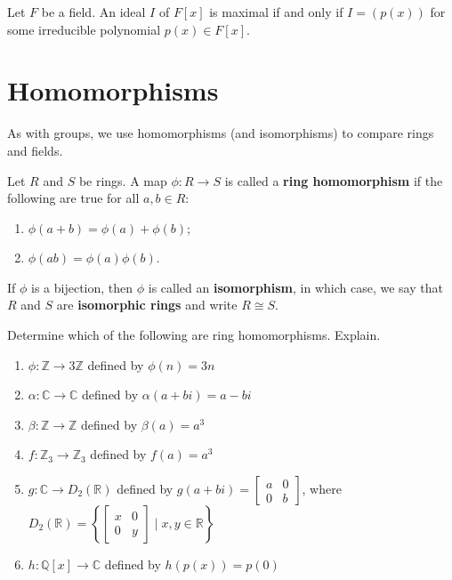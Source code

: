 \begin{theorem}\label{thm.MaximalIFFIrreducibleinFx}
Let $F$ be a field. An ideal $I$ of $F[x]$ is maximal if and only if $I=(p(x))$ for some irreducible polynomial $p(x)\in F[x]$.
\end{theorem}



\section{Homomorphisms}
As with groups, we use homomorphisms (and isomorphisms) to compare rings and fields.

\begin{definition}
Let $R$ and $S$ be rings. A map $\phi:R\to S$ is called a \textbf{ring homomorphism} if the following are true for all $a,b\in R$:
\begin{enumerate}
\item $\phi(a+b)=\phi(a)+\phi(b)$;
\item $\phi(ab)=\phi(a)\phi(b)$.
\end{enumerate}
If $\phi$ is a bijection, then $\phi$ is called an \textbf{isomorphism}, in which case, we say that $R$ and $S$ are \textbf{isomorphic rings} and write $R\cong S$.
\end{definition}

\begin{problem}\label{prob.HomomorphismCheckin}
Determine which of the following are ring homomorphisms. Explain.
\begin{enumerate}
\item $\phi: \mathbb{Z} \rightarrow 3\mathbb{Z}$ defined by $\phi(n) = 3n$
\item $\alpha: \mathbb{C} \rightarrow \mathbb{C}$ defined by $\alpha(a+bi) = a-bi$
\item $\beta: \mathbb{Z} \rightarrow \mathbb{Z}$ defined by $\beta(a) = a^3$
\item $f: \mathbb{Z}_3 \rightarrow \mathbb{Z}_3$ defined by $f(a) = a^3$
\item $g:  \mathbb{C}\rightarrow D_2\left(\mathbb{R}\right)$ defined by $\displaystyle g(a+bi) = \begin{bmatrix}a & 0 \\ 0 & b\end{bmatrix}$, where 
$\displaystyle D_2(\mathbb{R})=\left\{\begin{bmatrix}x & 0\\ 0 & y\end{bmatrix}\mid x,y\in \mathbb{R}\right\}$
\item\label{prob.HomomorphismCheckin.EvaluatePoly} $h: \mathbb{Q}[x] \rightarrow \mathbb{C}$ defined by $h(p(x)) = p(0)$
\end{enumerate}
\end{problem}

